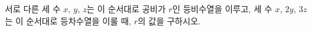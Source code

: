 서로 다른 세 수 $x$, $y$, $z$는 이 순서대로 공비가 $r$인 등비수열을 이루고, 세 수 $x$, $2y$, $3z$는 이 순서대로 등차수열을 이룰 때, $r$의 값을 구하시오.
